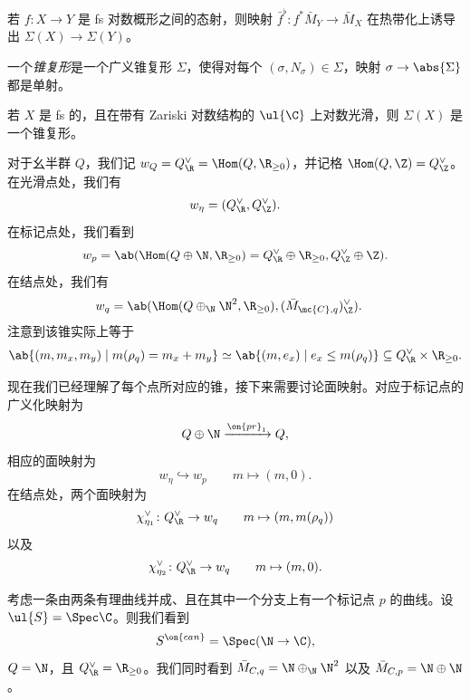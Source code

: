 \begin{exm}
    若 \(f \colon X \to Y\) 是 fs 对数概形之间的态射，则映射 \(\bar{f}^{\flat} \colon f^* \bar{M}_Y \to \bar{M}_X\) 在热带化上诱导出 \(\Sigma(X) \to \Sigma(Y)\)。
\end{exm}

\begin{defn}
    一个\textit{锥复形}是一个广义锥复形 \(\Sigma\)，使得对每个 \((\sigma, N_{\sigma}) \in \Sigma\)，映射 \(\sigma \to \abs{\Sigma}\) 都是单射。
\end{defn}

\begin{thm}
    若 \(X\) 是 fs 的，且在带有 Zariski 对数结构的 \(\ul{\C}\) 上对数光滑，则 \(\Sigma(X)\) 是一个锥复形。
\end{thm}

对于幺半群 \(Q\)，我们记 \(w_Q = Q_{\R}^{\vee} = \Hom(Q, \R_{\geq 0})\)，并记格 \(\Hom(Q, \Z) = Q_{\Z}^{\vee}\)。在光滑点处，我们有
\[ w_{\eta} = (Q_{\R}^{\vee}, Q_{\Z}^{\vee}). \]
在标记点处，我们看到
\[ w_p = \ab(\Hom (Q \oplus \N, \R_{\geq 0}) = Q_{\R}^{\vee} \oplus \R_{\geq 0}, Q_{\Z}^{\vee}\oplus \Z). \]
在结点处，我们有
\begin{align*}
    w_q &= \ab(\Hom(Q \oplus_{\N} \N^2, \R_{\geq 0}), ( \bar{M}_{\mc{C}, q} )_{\Z}^{\vee}).
\end{align*}
注意到该锥实际上等于
\[ \ab\{(m, m_x, m_y) \mid m(\rho_q) = m_x + m_y \} \simeq \ab\{(m, e_x) \mid e_x \leq m(\rho_q) \} \subseteq Q_{\R}^{\vee} \times \R_{\geq 0}. \]

现在我们已经理解了每个点所对应的锥，接下来需要讨论面映射。对应于标记点的广义化映射为
\[ Q \oplus \N \xrightarrow{\on{pr}_1} Q, \]
相应的面映射为
\[ w_{\eta} \hookrightarrow w_p \qquad m \mapsto (m,0). \]
在结点处，两个面映射为
\[ \chi_{\eta_1}^{\vee} \colon Q_{\R}^{\vee} \to w_q \qquad m \mapsto (m, m(\rho_q)) \]
以及
\[ \chi_{\eta_2}^{\vee} \colon Q_{\R}^{\vee} \to w_q \qquad m \mapsto (m, 0). \]

\begin{exm}
    考虑一条由两条有理曲线并成、且在其中一个分支上有一个标记点 \(p\) 的曲线。设 \(\ul{S} = \Spec \C\)。则我们看到
    \[ S^{\on{can}} = \Spec(\N \to \C), \]
    \(Q = \N\)，且 \(Q_{\R}^{\vee} = \R_{\geq 0}\)。我们同时看到 \(\bar{M}_{C, q} = \N \oplus_{\N} \N^2\) 以及 \(\bar{M}_{C, p} = \N \oplus \N\)。
\end{exm}

